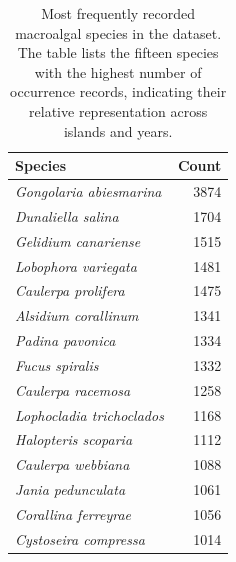 \documentclass[a4paper,fleqn]{cas-sc}
\begin{document}
\begin{table}[width=\linewidth,cols=2,pos=!htbp]
\caption{Most frequently recorded macroalgal species in the dataset. The table lists the fifteen species with the highest number of occurrence records, indicating their relative representation across islands and years.}
\small
\begin{tabular*}{\tblwidth}{@{} L R @{}}
\toprule
Species & Count \\
\midrule
\textit{Gongolaria abiesmarina} & 3874 \\
\textit{Dunaliella salina} & 1704 \\
\textit{Gelidium canariense} & 1515 \\
\textit{Lobophora variegata} & 1481 \\
\textit{Caulerpa prolifera} & 1475 \\
\textit{Alsidium corallinum} & 1341 \\
\textit{Padina pavonica} & 1334 \\
\textit{Fucus spiralis} & 1332 \\
\textit{Caulerpa racemosa} & 1258 \\
\textit{Lophocladia trichoclados} & 1168 \\
\textit{Halopteris scoparia} & 1112 \\
\textit{Caulerpa webbiana} & 1088 \\
\textit{Jania pedunculata} & 1061 \\
\textit{Corallina ferreyrae} & 1056 \\
\textit{Cystoseira compressa} & 1014 \\
\bottomrule
\end{tabular*}
\label{tab:8}
\end{table}
\end{document}
